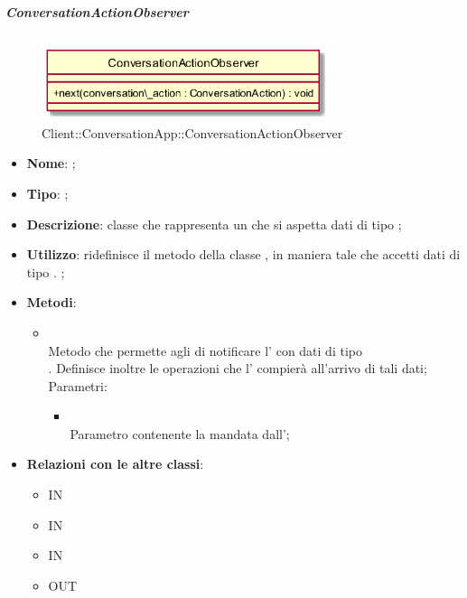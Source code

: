 \hypertarget{ConversationActionObserver_label}{\subparagraph{ConversationActionObserver}}
\begin{figure}[h]
	\centering
	\includegraphics[width=0.75\textwidth,height=\textheight,keepaspectratio]{images/ClassConversationActionObserver.png}
	\caption{Client::ConversationApp::ConversationActionObserver}
\end{figure}
\begin{itemize}
	\item \textbf{Nome}: ;
	\item \textbf{Tipo}: ;
	\item \textbf{Descrizione}: classe che rappresenta un  che si aspetta dati di tipo ;
	\item \textbf{Utilizzo}: ridefinisce il metodo  della classe , in maniera tale che accetti dati di tipo .
;
	\item \textbf{Metodi}:
	\begin{itemize}
		\item[]  \\		Metodo che permette agli  di notificare l' con dati di tipo \\ . Definisce inoltre le operazioni che l' compierà all'arrivo di tali dati;\\
		Parametri:
		\begin{itemize}
			\item {} \\
			Parametro contenente la  mandata dall';
		\end{itemize}
	\end{itemize}
	\item \textbf{Relazioni con le altre classi}:
	\begin{itemize}
		\item IN \hyperlink{ConversationActionObservable_label}{}
		\item IN \hyperlink{ConversationActionSubject_label}{}
		\item IN \hyperlink{MessageStore_label}{}
		\item OUT \hyperlink{ConversationAction_label}{}
	\end{itemize}
\end{itemize}
\FloatBarrier

